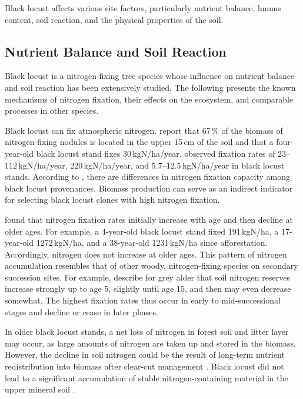 Black locust affects various site factors, particularly nutrient balance, humus content, soil reaction, and the physical properties of the soil.

\subsection{Nutrient Balance and Soil Reaction}

Black locust is a nitrogen-fixing tree species whose influence on nutrient balance and soil reaction has been extensively studied. The following presents the known mechanisms of nitrogen fixation, their effects on the ecosystem, and comparable processes in other species.

Black locust can fix atmospheric nitrogen.
\citet{boring1984robinieN} report that 67\,\% of the biomass of nitrogen-fixing nodules is located in the upper 15\,cm of the soil and that a four-year-old black locust stand fixes 30\,kgN/ha/year.
\citet{noh2009robinieN} observed fixation rates of 23–112\,kgN/ha/year, \citet{danso1995robinieN} 220\,kgN/ha/year, and \citet{marron2018robinieN} 5.7–12.5\,kgN/ha/year in black locust stands.
According to \citet{moshki2011robinieN}, there are differences in nitrogen fixation capacity among black locust provenances. Biomass production can serve as an indirect indicator for selecting black locust clones with high nitrogen fixation.

\citet{boring1984robinie} found that nitrogen fixation rates initially increase with age and then decline at older ages. For example, a 4-year-old black locust stand fixed 191\,kgN/ha, a 17-year-old 1272\,kgN/ha, and a 38-year-old 1231\,kgN/ha since afforestation. Accordingly, nitrogen does not increase at older ages. This pattern of nitrogen accumulation resembles that of other woody, nitrogen-fixing species on secondary succession sites.
For example, \citet{cleve1971grauerle} describe for grey alder that soil nitrogen reserves increase strongly up to age 5, slightly until age 15, and then may even decrease somewhat. The highest fixation rates thus occur in early to mid-successional stages and decline or cease in later phases.

In older black locust stands, a net loss of nitrogen in forest soil and litter layer may occur, as large amounts of nitrogen are taken up and stored in the biomass. However, the decline in soil nitrogen could be the result of long-term nutrient redistribution into biomass after clear-cut management \citep{boring1984robinie}.
Black locust did not lead to a significant accumulation of stable nitrogen-containing material in the upper mineral soil \citep{auten1945robinieN}.

